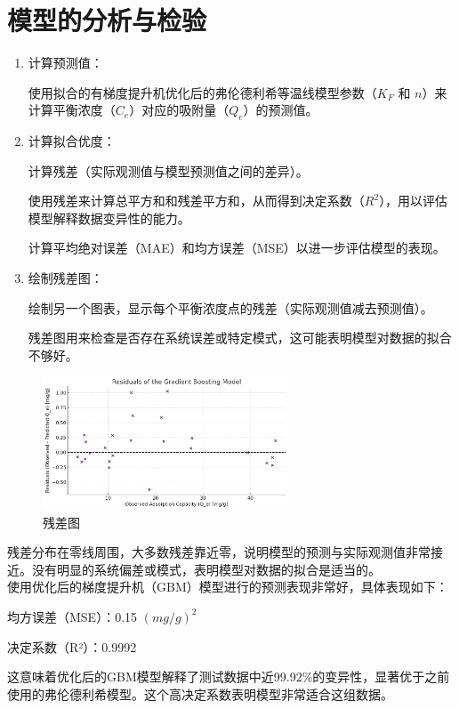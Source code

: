 \documentclass[AutoFakeBold]{ctexart}
\begin{document}
	\section{模型的分析与检验}
	\begin{enumerate}
		\item 计算预测值：
		
		 使用拟合的有梯度提升机优化后的弗伦德利希等温线模型参数（$K_F$ 和 $n$）来计算平衡浓度（$C_e$）对应的吸附量（$Q_e$）的预测值。
		
		\item 计算拟合优度：
		
		 计算残差（实际观测值与模型预测值之间的差异）。
		
		 使用残差来计算总平方和和残差平方和，从而得到决定系数（$R^{2}$），用以评估模型解释数据变异性的能力。
		
		 计算平均绝对误差（MAE）和均方误差（MSE）以进一步评估模型的表现。
		\item 绘制残差图：
		
		 绘制另一个图表，显示每个平衡浓度点的残差（实际观测值减去预测值）。
		
		 残差图用来检查是否存在系统误差或特定模式，这可能表明模型对数据的拟合不够好。
		\end{enumerate}
		\begin{figure}[H]
			\centering
			\includegraphics[width=0.65\textwidth]{残差.png}
			\caption{残差图}
			\end{figure}
				
				残差分布在零线周围，大多数残差靠近零，说明模型的预测与实际观测值非常接近。没有明显的系统偏差或模式，表明模型对数据的拟合是适当的。\\
					
		使用优化后的梯度提升机（GBM）模型进行的预测表现非常好，具体表现如下：
		
		均方误差（MSE）：0.15 $(mg/g)^2$
		
		决定系数（R²）：0.9992
		
		这意味着优化后的GBM模型解释了测试数据中近99.92\%的变异性，显著优于之前使用的弗伦德利希模型。这个高决定系数表明模型非常适合这组数据。
\end{document}
